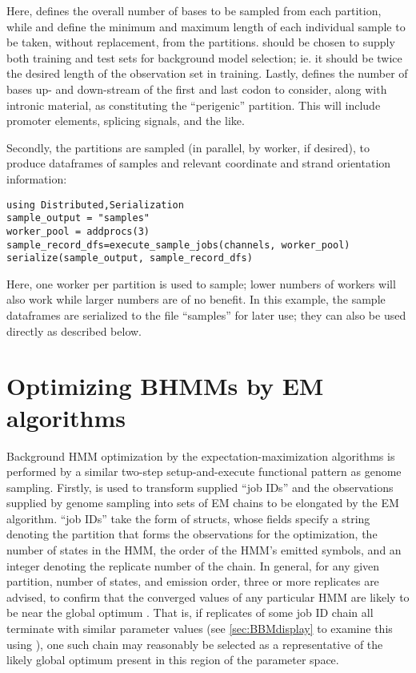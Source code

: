 Here,  defines the overall number of bases to be sampled from each partition, while  and  define the minimum and maximum length of each individual sample to be taken, without replacement, from the partitions.  should be chosen to supply both training and test sets for background model selection; ie. it should be twice the desired length of the observation set in training. Lastly,  defines the number of bases up- and down-stream of the first and last codon to consider, along with intronic material, as constituting the ``perigenic'' partition. This will include promoter elements, splicing signals, and the like.

Secondly, the partitions are sampled (in parallel, by worker, if desired), to produce dataframes of samples and relevant coordinate and strand orientation information:

\begin{verbatim}
using Distributed,Serialization
sample_output = "samples"
worker_pool = addprocs(3)
sample_record_dfs=execute_sample_jobs(channels, worker_pool)
serialize(sample_output, sample_record_dfs)
\end{verbatim}

Here, one worker per partition is used to sample; lower numbers of workers will also work while larger numbers are of no benefit. In this example, the sample dataframes are serialized to the file ``samples'' for later use; they can also be used directly as described below.

\section{Optimizing BHMMs by EM algorithms}
Background HMM optimization by the expectation-maximization algorithms is performed by a similar two-step setup-and-execute functional pattern as genome sampling. Firstly,  is used to transform supplied ``job IDs'' and the observations supplied by genome sampling into sets of EM chains to be elongated by the EM algorithm.  ``job IDs'' take the form of  structs, whose fields specify a string denoting the partition that forms the observations for the optimization, the number of states in the HMM, the order of the HMM's emitted symbols, and an integer denoting the replicate number of the chain. In general, for any given partition, number of states, and emission order, three or more replicates are advised, to confirm that the converged values of any particular HMM are likely to be near the global optimum \cite{Yang2015b}. That is, if replicates of some job ID chain all terminate with similar parameter values (see \autoref{sec:BBMdisplay} to examine this using ), one such chain may reasonably be selected as a representative of the likely global optimum present in this region of the parameter space.

